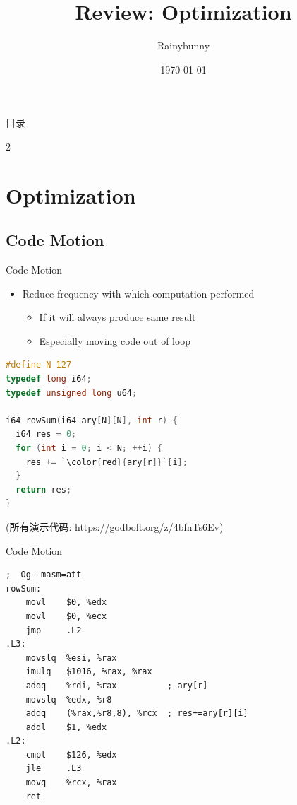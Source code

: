 ﻿\documentclass{ctexbeamer}
\begin{document}
\title{Review: Optimization}
\author{Rainybunny}
\date{\today}
\frame{\titlepage}

\begin{frame}{目录}
  \begin{multicols}{2}
    \tableofcontents
  \end{multicols}
\end{frame}


\section{Optimization}

\subsection{Code Motion}

\begin{frame}[fragile]{Code Motion}
  \begin{itemize}
    \item Reduce frequency with which computation performed
    \begin{itemize}
      \item If it will always produce same result
      \item Especially moving code out of loop
    \end{itemize}
  \end{itemize}

  \begin{lstlisting}[language=C]
#define N 127
typedef long i64;
typedef unsigned long u64;

i64 rowSum(i64 ary[N][N], int r) {
  i64 res = 0;
  for (int i = 0; i < N; ++i) {
    res += `\color{red}{ary[r]}`[i];
  }
  return res;
}
  \end{lstlisting}

  (所有演示代码: https://godbolt.org/z/4bfnTs6Ev)
\end{frame}

\begin{frame}[fragile,shrink=5]{Code Motion}
  \begin{lstlisting}[language=x86_64]
; -Og -masm=att
rowSum:
    movl    $0, %edx
    movl    $0, %ecx
    jmp     .L2
.L3:
    movslq  %esi, %rax
    imulq   $1016, %rax, %rax
    addq    %rdi, %rax          ; ary[r]
    movslq  %edx, %r8
    addq    (%rax,%r8,8), %rcx  ; res+=ary[r][i]
    addl    $1, %edx
.L2:
    cmpl    $126, %edx
    jle     .L3
    movq    %rcx, %rax
    ret
  \end{lstlisting}
\end{frame}
\end{document}
